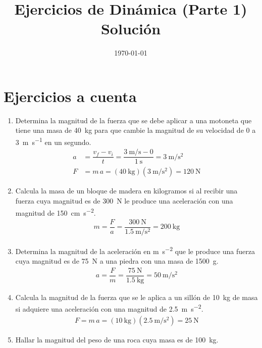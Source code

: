 \documentclass[14pt]{extarticle}
\title{\vspace*{-2cm} Ejercicios de Dinámica (Parte 1) Solución\vspace{-5ex}}
\date{\today}
\begin{document}
\maketitle

\section{Ejercicios a cuenta}

\begin{enumerate}
\item Determina la magnitud de la fuerza que se debe aplicar a una motoneta que tiene una masa de \SI{40}{\kilogram} para que cambie la magnitud de su velocidad de $0$ a \SI{3}{\meter\per\second} en un segundo.
\begin{align*}
a &= \dfrac{v_{f} - v_{i}}{t} = \dfrac{\SI{3}{\meter\per\second} - 0}{\SI{1}{\second}} = \SI{3}{\meter\per\square\second} \\[0.5em]
F &= m \, a = (\SI{40}{\kilo\gram})(\SI{3}{\meter\per\square\second}) = \SI{120}{\newton}
\end{align*}
\item Calcula la masa de un bloque de madera en kilogramos si al recibir una fuerza cuya magnitud es de \SI{300}{\newton} le produce una aceleración con una magnitud de \SI{150}{\centi\meter\per\square\second}.
\begin{align*}
m = \dfrac{F}{a} = \dfrac{\SI{300}{\newton}}{\SI{1.5}{\meter\per\square\second}} = \SI{200}{\kilo\gram}
\end{align*}
\item Determina la magnitud de la aceleración en \unit{\meter\per\square\second} que le produce una fuerza cuya magnitud es de \SI{75}{\newton} a una piedra con una masa de \SI{1500}{\gram}.
\begin{align*}
a = \dfrac{F}{m} = \dfrac{\SI{75}{\newton}}{\SI{1.5}{\kilo\gram}} = \SI{50}{\meter\per\square\second}
\end{align*}
\item Calcula la magnitud de la fuerza que se le aplica a un sillón de \SI{10}{\kilo\gram} de masa si  adquiere una aceleración con una magnitud de \SI{2.5}{\meter\per\square\second}.
\begin{align*}
F = m \, a = (\SI{10}{\kilo\gram})(\SI{2.5}{\meter\per\square\second}) = \SI{25}{\newton}
\end{align*}
\item Hallar la magnitud del peso de una roca cuya masa es de \SI{100}{\kilo\gram}.
\begin{align*}

\end{align*}
\end{enumerate}
\end{document}
